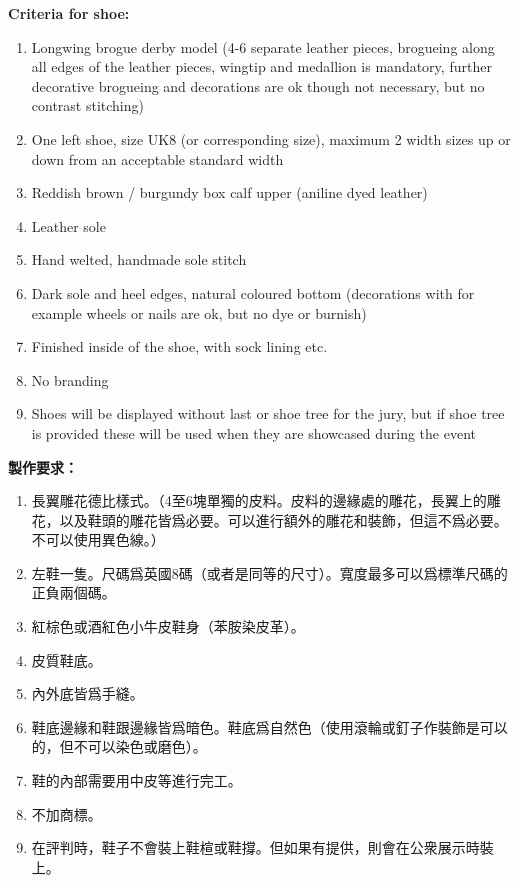 \begin{paracol}{2}

    \switchcolumn*

    \bgroup\obeylines

        \textbf{Criteria for shoe:}
        \begin{enumerate}
            \item Longwing brogue derby model (4-6 separate leather pieces, brogueing along all edges of the leather pieces, wingtip and medallion is mandatory, further decorative brogueing and decorations are ok though not necessary, but no contrast stitching)
            \item One left shoe, size UK8 (or corresponding size), maximum 2 width sizes up or down from an acceptable standard width
            \item Reddish brown / burgundy box calf upper (aniline dyed leather)
            \item Leather sole
            \item Hand welted, handmade sole stitch
            \item Dark sole and heel edges, natural coloured bottom (decorations with for example wheels or nails are ok, but no dye or burnish)
            \item Finished inside of the shoe, with sock lining etc.
            \item No branding
            \item Shoes will be displayed without last or shoe tree for the jury, but if shoe tree is provided these will be used when they are showcased during the event
        \end{enumerate}

        \newpage

        \switchcolumn
        \textbf{製作要求：}
        \begin{enumerate}
            \item 長翼雕花德比樣式。（4至6塊單獨的皮料。皮料的邊緣處的雕花，長翼上的雕花，以及鞋頭的雕花皆爲必要。可以進行額外的雕花和裝飾，但這不爲必要。不可以使用異色線。）
            \item 左鞋一隻。尺碼爲英國8碼（或者是同等的尺寸）。寬度最多可以爲標準尺碼的正負兩個碼。
            \item 紅棕色或酒紅色小牛皮鞋身（苯胺染皮革）。
            \item 皮質鞋底。
            \item 內外底皆爲手縫。
            \item 鞋底邊緣和鞋跟邊緣皆爲暗色。鞋底爲自然色（使用滾輪或釘子作裝飾是可以的，但不可以染色或磨色）。
            \item 鞋的內部需要用中皮等進行完工。
            \item 不加商標。
            \item 在評判時，鞋子不會裝上鞋楦或鞋撐。但如果有提供，則會在公衆展示時裝上。
        \end{enumerate}
        \switchcolumn*


\end{paracol}
